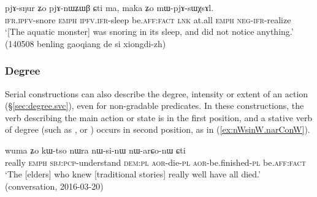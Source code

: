 \begin{exe}
\ex \label{ex:pjAsNur.Zo.pjAnWZWB}
\gll pjɤ-sŋur ʑo pjɤ-nɯʑɯβ ɕti ma, maka ʑo mɯ-pjɤ-sɯχsɤl. \\
\textsc{ifr}.\textsc{ipfv}-snore \textsc{emph} \textsc{ipfv}.\textsc{ifr}-sleep be.\textsc{aff}:\textsc{fact} \textsc{lnk} at.all \textsc{emph}  \textsc{neg}-\textsc{ifr}-realize \\
\glt `[The aquatic monster] was snoring in its sleep, and did not notice anything.' (140508 benling gaoqiang de si xiongdi-zh)
\end{exe}



\subsubsection{Degree} \label{sec:svc.degree}
Serial constructions can also describe the degree, intensity or extent of an action (§\ref{sec:degree.svc}), even for non-gradable predicates. In these constructions, the verb describing the main action or state is in the first position, and a stative verb of degree (such as ,  or ) occurs in second position, as in (\ref{ex:nWsinW.narConW}).

\begin{exe}
\ex \label{ex:nWsinW.narConW}
\gll   wuma ʑo kɯ-tso nɯra nɯ-si-nɯ nɯ-arɕo-nɯ ɕti \\
really \textsc{emph} \textsc{sbj}:\textsc{pcp}-understand \textsc{dem}:\textsc{pl} \textsc{aor}-die-\textsc{pl} \textsc{aor}-be.finished-\textsc{pl} be.\textsc{aff}:\textsc{fact} \\
\glt `The [elders] who knew [traditional stories] really well have all died.' (conversation, 2016-03-20)
\end{exe}


